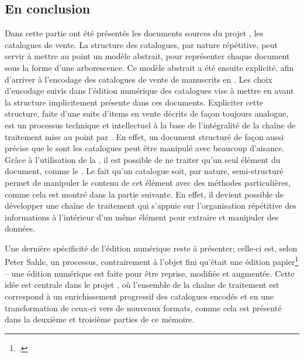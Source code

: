 \subsection{En conclusion}
Dans cette partie ont été présentés les documents sources du projet \mssktb{}, les catalogues de vente. La structure des catalogues, par nature répétitive, peut servir à mettre au point un modèle abstrait, pour représenter chaque document sous la forme d'une arborescence. Ce modèle abstrait a été ensuite explicité, afin d'arriver à l'encodage des catalogues de vente de manuscrits en \xmltei{}. Les choix d'encodage suivis dans l'édition numérique des catalogues vise à mettre en avant la structure implicitement présente dans ces documents. Expliciter cette structure, faite d'une suite d'items en vente décrits de façon toujours analogue, est un processus technique et intellectuel à la base de l'intégralité de la chaîne de traitement mise au point par \mssktb{}. En effet, un document structuré de façon aussi précise que le sont les catalogues peut être manipulé avec beaucoup d'aisance. Grâce à l'utilisation de la \tei{}, il est possible de ne traiter qu'un seul élément du document, comme le \tname{}. Le fait qu'un catalogue soit, par nature, semi-structuré permet de manipuler le contenu de cet élément avec des méthodes particulières, comme cela est montré dans la partie suivante. En effet, il devient possible de développer une chaîne de traitement qui s'appuie sur l'organisation répétitive des informations à l'intérieur d'un même élément pour extraire et manipuler des données.

Une dernière spécificité de l'édition numérique reste à présenter; celle-ci est, selon Peter Sahle, un processus, contrairement à l'objet fini qu'était une édition papier\footcite{sahle_digital_2016} -- une édition numérique est faite pour être reprise, modifiée et augmentée. Cette idée est centrale dans le projet \ktb{}, où l'ensemble de la chaîne de traitement est correspond à un enrichissement progressif des catalogues encodés et en une transformation de ceux-ci vers de nouveaux formats, comme cela est présenté dans la deuxième et troisième parties de ce mémoire.